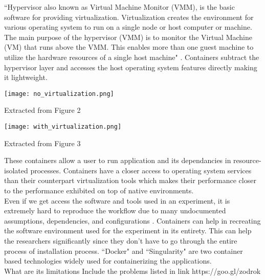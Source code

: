 ``Hypervisor also known as Virtual Machine Monitor (VMM), is the basic software for providing virtualization. Virtualization creates the environment for various operating system to run on a single node or host computer or machine. The main purpose of the hypervisor (VMM) is to monitor the Virtual Machine (VM) that runs above the VMM. This enables more than one guest machine to utilize the hardware resources of a single host machine" \cite{hypervisor}. Containers subtract the hypervisor layer and accesses the host operating system features directly making it lightweight.\\

\begin{center}
\begin{minipage}{0.48\linewidth}
\texttt{[image: no\_virtualization.png]}
\label{fig:novirtualization}
\caption*{Extracted from \cite{10.4236/ijcns.2015.87026} Figure 2}
\end{minipage}%
\hfill
\begin{minipage}{0.48\linewidth}
\texttt{[image: with\_virtualization.png]}
\label{fig:aftervirtualization}
\caption*{Extracted from \cite{10.4236/ijcns.2015.87026} Figure 3}
\end{minipage}
\end{center}

These containers allow a user to run application and its dependancies in resource-isolated processes. Containers have a closer access to operating system services than their counterpart virtualization tools which makes their performance closer to the performance exhibited on top of native environments\cite{Xavier:2013:PEC:2497369.2497577}.\\

Even if we get access the software and tools used in an experiment, it is extremely hard to reproduce the workflow due to many undocumented assumptions, dependencies, and configurations \cite{7883438}. Containers can help in recreating the software environment used for the experiment in its entirety. This can help the researchers significantly since they don't have to go through the entire process of installation process. ``Docker" and ``Singularity" are two container based technologies widely used for containerizing the applications.\\

What are its limitations
Include the problems listed in link https://goo.gl/zodrok

